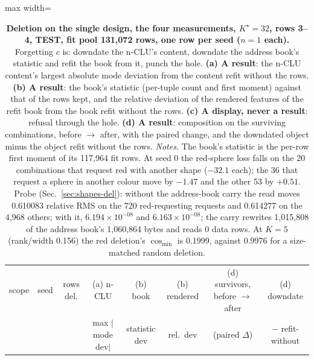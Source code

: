 \documentclass{article} %
\newcommand{\sci}[2]{\ensuremath{#1\times10^{#2}}}
\newcommand{\Kstar}{\ensuremath{K^{\star}}}
\begin{document}
\begin{table}[t]
\centering\small
\caption{\textbf{Deletion on the single design, the four measurements, $\Kstar=32$, rows 3--4, TEST, fit %
pool 131,072 rows, one row per seed ($n=1$ each).} Forgetting $c$ is: downdate the n-CLU's content, downdate %
the address book's statistic and refit the book from it, punch the hole. \textbf{(a) A result}: the
n-CLU content's largest absolute mode deviation from the content refit without the rows. \textbf{(b) A
result}: the book's statistic (per-tuple count and first moment) against that of the rows kept, and
the relative deviation of the rendered features of the refit book from the book refit without the
rows. \textbf{(c) A display, never a result}: refusal through the hole. \textbf{(d) A result}:
composition on the surviving combinations, before $\to$ after, with the paired change, and the downdated
object minus the object refit without the rows. \emph{Notes.} The book's statistic is the per-row first moment %
of its 117,964 fit rows. At seed 0 the red-sphere loss falls on the 20 combinations that request red with %
another shape ($-32.1$ each); the 36 that request a sphere in another colour move by $-1.47$ and the other 53 %
by $+0.51$. Probe (Sec.~\ref{sec:shapes-del}): without the address-book carry the read moves 0.610083 relative %
RMS on the 720 red-requesting requests and 0.614277 on the 4,968 others; with it, \sci{6.194}{-08} and %
\sci{6.163}{-08}; the carry rewrites 1,015,808 of the address book's 1,060,864 bytes and reads 0 data rows. %
At $K=5$ (rank/width 0.156) the red deletion's $\cos_{\min}$ is 0.1999, against 0.9976 for a size-matched %
random deletion.}
\label{tab:del}
\setlength{\tabcolsep}{2.6pt}
\begin{adjustbox}{max width=\linewidth}\begin{tabular}{lccccccc}
\toprule
scope & seed & rows del. & (a) n-CLU & (b) book & (b) rendered & (d) survivors, before $\to$ after & (d) downdate \\
 & & & max $|$mode dev$|$ & statistic dev & rel.\ dev & (paired $\Delta$) & $-$ refit-without \\
\midrule

\end{tabular}
\end{adjustbox}
\end{table}
\end{document}
